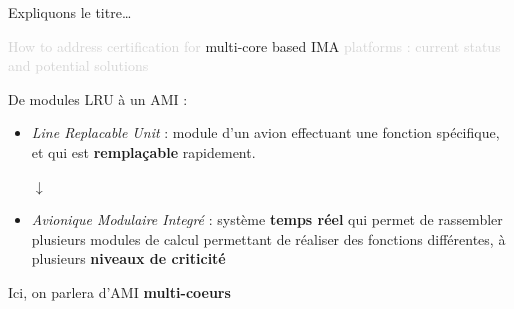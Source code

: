 \documentclass{beamer}
\begin{document}
\begin{frame}[t]{Expliquons le titre\ldots}
  
  \begin{center}
    \begin{mdframed}[style=yellowbox]
      {\small\textcolor{lightgray}{How to address certification for} multi-core based IMA \textcolor{lightgray}{platforms :
       current status and potential solutions}}
       \end{mdframed}
  \end{center}
  
      De modules LRU à un AMI :
      \begin{itemize}
          \item \textit{Line Replacable Unit} : module d'un avion effectuant une fonction
			  spécifique, et qui est \textbf{remplaçable} rapidement. \\\pause
          \begin{center}
              $\downarrow$
          \end{center}
          \item \textit{Avionique Modulaire Integré} : système \textbf{temps réel} qui permet de rassembler plusieurs 
          modules de calcul permettant de réaliser des fonctions différentes, à plusieurs
		  \textbf{niveaux de criticité} \\\pause
      \end{itemize}
	  Ici, on parlera d'AMI \textbf{multi-coeurs}
\end{frame}
\end{document}
